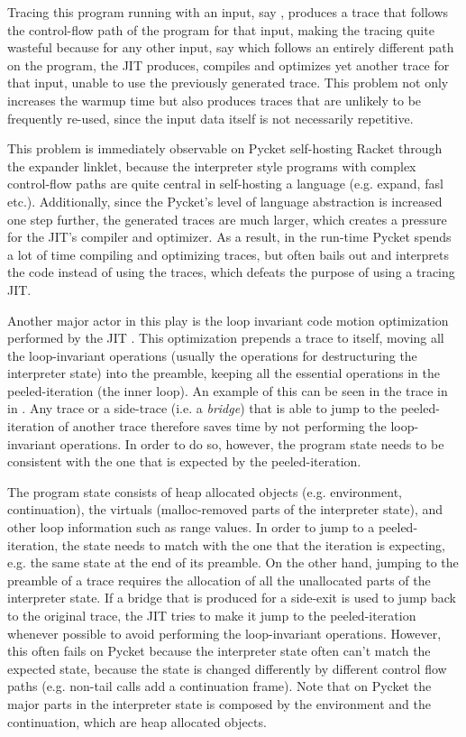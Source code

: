 Tracing this program running with an input, say ,
produces a trace that follows the control-flow path of the program for
that input, making the tracing quite wasteful because for any other
input, say  which follows an entirely different
path on the program, the JIT produces, compiles and optimizes yet
another trace for that input, unable to use the previously generated
trace. This problem not only increases the warmup time but also
produces traces that are unlikely to be frequently re-used, since the
input data itself is not necessarily repetitive.

This problem is immediately observable on Pycket self-hosting Racket
through the expander linklet, because the interpreter style programs
with complex control-flow paths are quite central in self-hosting a
language (e.g. expand, fasl etc.). Additionally, since the Pycket's
level of language abstraction is increased one step further, the
generated traces are much larger, which creates a pressure for the
JIT's compiler and optimizer. As a result, in the run-time Pycket
spends a lot of time compiling and optimizing traces, but often bails
out and interprets the code instead of using the traces, which defeats
the purpose of using a tracing JIT.

Another major actor in this play is the loop invariant code motion
optimization performed by the JIT \cite{loop-aware:12}. This
optimization prepends a trace to itself, moving all the loop-invariant
operations (usually the operations for destructuring the interpreter
state) into the preamble, keeping all the essential operations in the
peeled-iteration (the inner loop). An example of this can be seen in
the trace in  in . Any trace
or a side-trace (i.e. a \emph{bridge}) that is able to jump to the
peeled-iteration of another trace therefore saves time by not
performing the loop-invariant operations. In order to do so, however,
the program state needs to be consistent with the one that is expected
by the peeled-iteration.

The program state consists of heap allocated objects
(e.g. environment, continuation), the virtuals (malloc-removed parts
of the interpreter state), and other loop information such as range
values. In order to jump to a peeled-iteration, the state needs to
match with the one that the iteration is expecting, e.g. the same
state at the end of its preamble. On the other hand, jumping to the
preamble of a trace requires the allocation of all the unallocated
parts of the interpreter state. If a bridge that is produced for a
side-exit is used to jump back to the original trace, the JIT tries to
make it jump to the peeled-iteration whenever possible to avoid
performing the loop-invariant operations. However, this often fails on
Pycket because the interpreter state often can't match the expected
state, because the state is changed differently by different control
flow paths (e.g. non-tail calls add a continuation frame). Note that
on Pycket the major parts in the interpreter state is composed by the
environment and the continuation, which are heap allocated objects.

